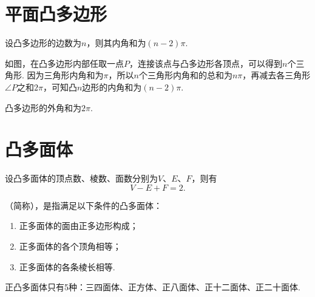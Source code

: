 \section{平面凸多边形}
\begin{theorem}
设凸多边形的边数为\(n\)，则其内角和为\((n-2)\pi\).
\end{theorem}
如图，在凸多边形内部任取一点\(P\)，连接该点与凸多边形各顶点，可以得到\(n\)个三角形.
因为三角形内角和为\(\pi\)，所以\(n\)个三角形内角和的总和为\(n\pi\)，再减去各三角形\(\angle P\)之和\(2\pi\)，可知凸\(n\)边形的内角和为\((n-2)\pi\).
\begin{center}
\end{center}

\begin{theorem}
凸多边形的外角和为\(2\pi\).
\end{theorem}

\section{凸多面体}
\begin{theorem}[欧拉公式]
设凸多面体的顶点数、棱数、面数分别为\(V\)、\(E\)、\(F\)，则有\[
V - E + F = 2.
\]
\end{theorem}

\begin{definition}
（简称），是指满足以下条件的凸多面体：
\begin{enumerate}
\item 正多面体的面由正多边形构成；
\item 正多面体的各个顶角相等；
\item 正多面体的各条棱长相等.
\end{enumerate}
\end{definition}

\begin{corollary}
正凸多面体只有5种：三四面体、正方体、正八面体、正十二面体、正二十面体.
\end{corollary}
